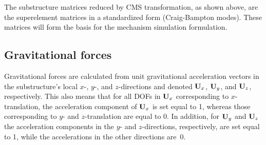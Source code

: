 {The substructure matrices reduced by CMS transformation, as shown above,
are the superelement matrices in a standardized form (Craig-Bampton modes).
These matrices will form the basis for the mechanism simulation formulation.

\subsection{Gravitational forces}

Gravitational forces are calculated from unit gravitational acceleration vectors in the substructure's
local $x$-, $y$-, and $z$-directions and denoted ${\bf U}_x$, ${\bf U}_y$, and ${\bf U}_z$,
respectively. This also means that for all DOFs in ${\bf U}_x$ corresponding to $x$-translation,
the acceleration component of ${\bf U}_x$ is set equal to 1, whereas those corresponding to
$y$- and $z$-translation are equal to 0. In addition, for ${\bf U}_y$ and ${\bf U}_z$ the acceleration
components in the $y$- and $z$-directions, respectively, are set equal to 1, while the accelerations
in the other directions are~0.

}
